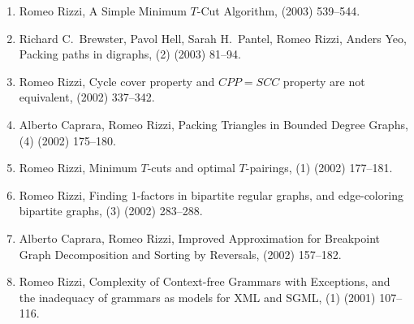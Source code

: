 \documentclass[11pt]{article}
\begin{document}
\begin{enumerate}
  \item {\sc Romeo Rizzi},
   \newblock  A Simple Minimum $T$-Cut Algorithm,
    (2003) 539--544.

  \item {\sc Richard C.~Brewster, Pavol Hell, Sarah H.~Pantel, Romeo Rizzi, Anders Yeo},
   \newblock  Packing paths in digraphs,
   (2) (2003) 81--94.

  \item {\sc Romeo Rizzi},
   \newblock  Cycle cover property and $CPP=SCC$ property are not equivalent,
    (2002) 337--342.

  \item {\sc Alberto Caprara, Romeo Rizzi},
   \newblock  Packing Triangles in Bounded Degree Graphs,
   (4) (2002) 175--180.

  \item {\sc Romeo Rizzi},
   \newblock  Minimum $T$-cuts and optimal $T$-pairings,
   (1) (2002) 177--181.

  \item {\sc Romeo Rizzi},
   \newblock  Finding $1$-factors in bipartite regular graphs,
              and edge-coloring bipartite graphs,
   (3) (2002) 283--288. 

  \item {\sc Alberto Caprara, Romeo Rizzi},
   \newblock  Improved Approximation for Breakpoint Graph Decomposition
              and Sorting by Reversals,
    (2002) 157--182.

  \item {\sc Romeo Rizzi},
   \newblock  Complexity of Context-free Grammars with Exceptions,
              and the inadequacy of grammars as models for XML and SGML,
   (1) (2001) 107--116.


\end{enumerate}
\end{document}
